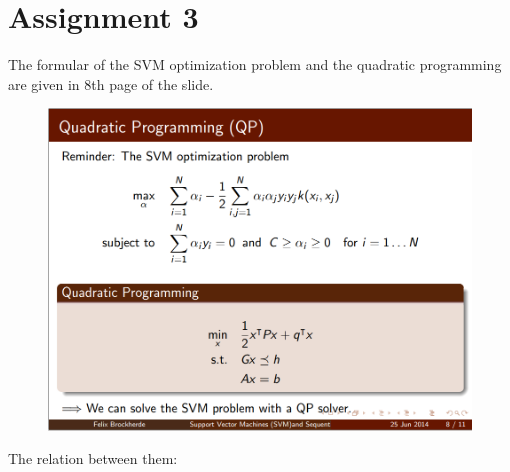 \documentclass[a4paper,11pt]{article}
\begin{document}
\section*{Assignment 3}
The formular of the SVM optimization problem and the quadratic programming are given in 8th page of the slide.


\begin{figure}[htbp]
  \includegraphics[scale=0.4]{qpform.png}
\end{figure}

The relation between them: 
\end{document}
